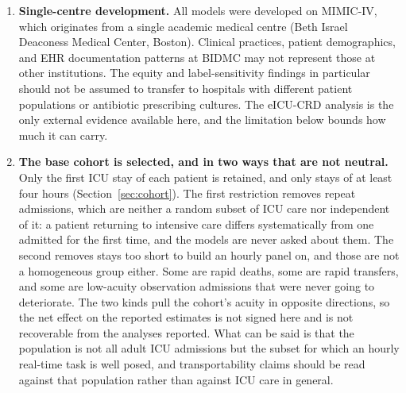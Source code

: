 \begin{enumerate}
    \item \textbf{Single-centre development.} All models were developed on
    MIMIC-IV, which originates from a single academic medical centre (Beth
    Israel Deaconess Medical Center, Boston). Clinical practices, patient
    demographics, and EHR documentation patterns at BIDMC may not represent
    those at other institutions. The equity and label-sensitivity findings in
    particular should not be assumed to transfer to hospitals with different
    patient populations or antibiotic prescribing cultures. The eICU-CRD
    analysis is the only external evidence available here, and the limitation
    below bounds how much it can carry.

    \item \textbf{The base cohort is selected, and in two ways that are not
    neutral.}\label{lim:cohort_selection} Only the first ICU stay of each
    patient is retained, and only stays of at least four hours
    (Section~\ref{sec:cohort}). The first restriction removes repeat
    admissions, which are neither a random subset of ICU care nor independent
    of it: a patient returning to intensive care differs systematically from
    one admitted for the first time, and the models are never asked about them.
    The second removes stays too short to build an hourly panel on, and those
    are not a homogeneous group either. Some are rapid deaths, some are rapid
    transfers, and some are low-acuity observation admissions that were never
    going to deteriorate. The two kinds pull the cohort's acuity in opposite
    directions, so the net effect on the reported estimates is not signed here
    and is not recoverable from the analyses reported. What can be said is that
    the population is not all adult ICU admissions but the subset for which an
    hourly real-time task is well posed, and transportability claims should be
    read against that population rather than against ICU care in general.


\end{enumerate}
